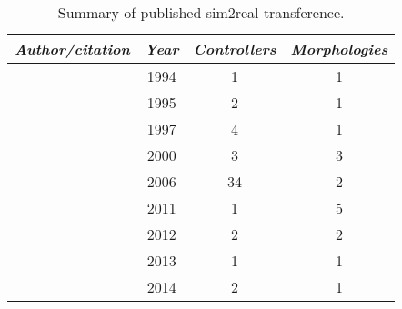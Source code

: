 
\begin{table}[t]
\caption{\label{table:lit_review}Summary of published sim2real transference.}
\vspace{-1.25em}
\begin{center}
\begin{tabular}{lccc} 
    \toprule
    \textit{Author/citation} & \textit{Year} & \textit{Controllers} & \textit{Morphologies} \\ 
    \midrule
    
    \citet{Miglino1994Selection}    & 1994 & 1 & 1 \\  %
    \citet{jakobi1995noise}         & 1995 & 2 & 1 \\  %
    
    
    \citet{HARVEY1997205}           & 1997 & 4 & 1 \\  %
    
    \citet{lipson2000automatic}     & 2000 & 3 & 3 \\
    
    \citet{bongard2006resilient}    & 2006 & 34 & 2 \\
    
    \citet{hiller2011automatic}     & 2011 & 1 & 5 \\ 
    
    \citet{koos2012transferability} & 2012 & 2 & 2 \\ 
    
    \citet{moeckel2013gait}         & 2013 & 1 & 1 \\  %
    
    \citet{caluwaerts2014design}    & 2014 & 2 & 1 \\ %
    

\end{tabular}
\end{center}
\end{table}
